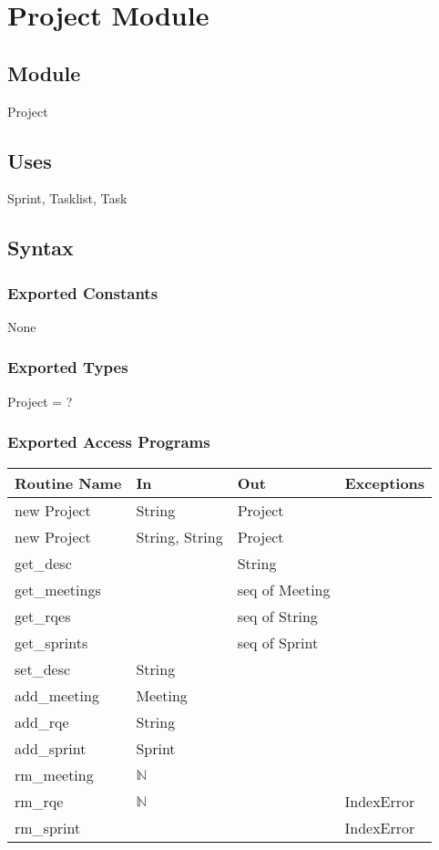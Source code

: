 \documentclass[12pt, titlepage]{article}
\begin{document}
\newpage

\section* {Project Module}

\subsection*{Module}
Project

\subsection* {Uses}
Sprint, Tasklist, Task

\subsection* {Syntax}
\subsubsection* {Exported Constants}
None

\subsubsection* {Exported Types}
Project = ?

\subsubsection* {Exported Access Programs}
\begin{tabular}{|l|l|l|l|}
    \hline
    \textbf{Routine Name} & \textbf{In} & \textbf{Out} & \textbf{Exceptions} \\
    \hline
    new Project & String & Project & \\
    \hline
    new Project & String, String & Project & \\
    \hline
    get\_desc & & String &\\
    \hline
    get\_meetings & & seq of Meeting &\\
    \hline
    get\_rqes & & seq of String & \\
    \hline
    get\_sprints & & seq of Sprint & \\
    \hline
    set\_desc & String & &\\
    \hline
    add\_meeting & Meeting & & \\
    \hline
    add\_rqe & String & & \\
    \hline
    add\_sprint & Sprint & & \\
    \hline
    rm\_meeting & $\mathbb{N}$ &  &\\
    \hline
    rm\_rqe & $\mathbb{N}$ &  & IndexError\\
    \hline
    rm\_sprint & & & IndexError\\
    \hline
\end{tabular}
\end{document}
